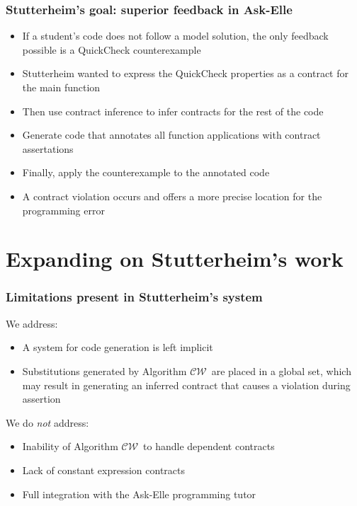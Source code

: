 \documentclass[]{beamer}
\newcommand{\CW}{$\mathcal{CW}$}
\begin{document}
\begin{frame}[fragile]
\frametitle{Stutterheim's goal: superior feedback in Ask-Elle}

\begin{itemize}
	\item If a student's code does not follow a model solution, the only feedback possible is a QuickCheck counterexample
	\item Stutterheim wanted to express the QuickCheck properties as a contract for the main function
	\item Then use contract inference to infer contracts for the rest of the code
	\item Generate code that annotates all function applications with contract assertations
	\item Finally, apply the counterexample to the annotated code
	\item A contract violation occurs and offers a more precise location for the programming error
\end{itemize}

\end{frame}

\section{Expanding on Stutterheim's work}

\begin{frame}[fragile]
\frametitle{Limitations present in Stutterheim's system}

We address:
\begin{itemize}
	\item A system for code generation is left implicit
	\item Substitutions generated by Algorithm \CW ~are placed in a global set, which may result in generating an inferred contract that causes a violation during assertion
\end{itemize}

We do \textit{not} address:

\begin{itemize}
	\item Inability of Algorithm \CW ~to handle dependent contracts
	\item Lack of constant expression contracts
	\item Full integration with the Ask-Elle programming tutor
\end{itemize}

\end{frame}
\end{document}
